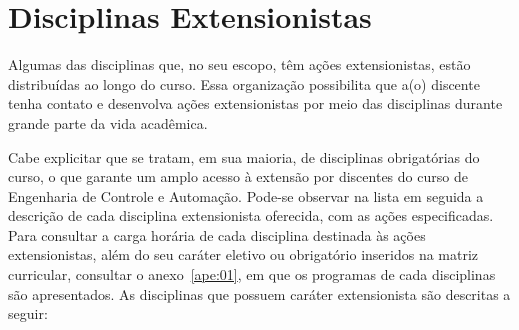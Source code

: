 \documentclass[
	12pt,				%
	openright,			%
	oneside,			%
	a4paper,			%
	english,			%
	brazil				%
	]{abntex2}
\begin{document}
\section{Disciplinas Extensionistas}
Algumas das disciplinas que, no seu escopo, têm ações extensionistas, estão distribuídas ao longo do curso. Essa organização possibilita que a(o) discente tenha contato e desenvolva ações extensionistas por meio das disciplinas durante grande parte da vida acadêmica.

Cabe explicitar que se tratam, em sua maioria, de disciplinas obrigatórias do curso, o que garante um amplo acesso à extensão por discentes do curso de Engenharia de Controle e Automação. Pode-se observar na lista em seguida a descrição de cada disciplina extensionista oferecida, com as ações especificadas. Para consultar a carga horária de cada disciplina destinada às ações extensionistas, além do seu caráter eletivo ou obrigatório inseridos na matriz curricular, consultar o anexo~\ref{ape:01}, em que os programas de cada disciplinas são apresentados. As disciplinas que possuem caráter extensionista são descritas a seguir:
\end{document}
